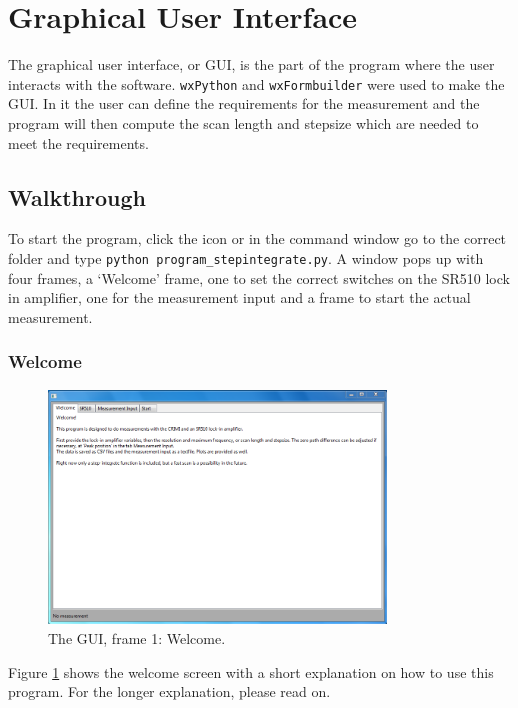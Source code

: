 
\section{Graphical User Interface}
The graphical user interface, or GUI, is the part of the program where the user interacts with the software. \verb!wxPython! and \verb!wxFormbuilder! were used to make the GUI. In it the user can define the requirements for the measurement and the program will then compute the scan length and stepsize which are needed to meet the requirements.

\subsection{Walkthrough}

To start the program, click the icon or in the command window go to the correct folder and type \verb!python program_stepintegrate.py!. A window pops up with four frames, a `Welcome' frame, one to set the correct switches on the SR510 lock in amplifier, one for the measurement input and a frame to start the actual measurement.

\subsubsection{Welcome}

\begin{figure}[!ht]
 \begin{center}
  \includegraphics[width=0.8\textwidth]{figures/gui1}
  \caption{The GUI, frame 1: Welcome.}
  \label{fig:gui1}
 \end{center}
\end{figure}

Figure \ref{fig:gui1} shows the welcome screen with a short explanation on how to use this program. For the longer explanation, please read on.

